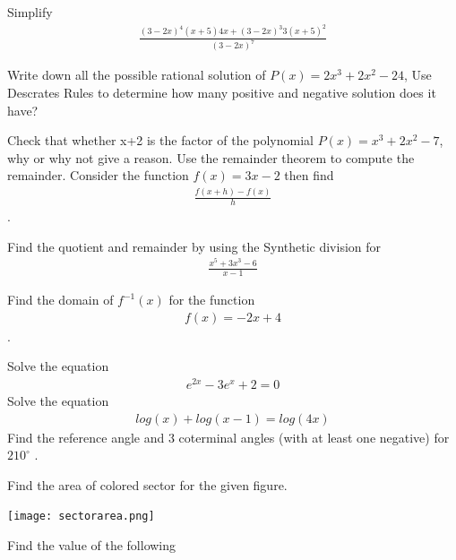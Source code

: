 \documentclass[11pt]{exam}
\begin{document}
\begin{questions}
\addpoints
\question[4] Simplify 
		\begin{align*}
		\frac{(3-2x)^4 (x+5)4x+(3-2x)^3 3(x+5)^2}{(3-2x)^7}
		\end{align*}

\vspace{7cm}
\question[4] Write down all the possible rational solution of $P(x)=2x^3+2x^2-24$, Use Descrates Rules to determine how many positive and negative solution does it have?

\vspace{8cm}
\question[3] Check that whether x+2 is the factor of the polynomial $P(x)=x^3+2x^2-7$, why or why not give a reason. Use the remainder theorem to compute the remainder. 
\vspace{6cm}		
\addpoints
\question[4] Consider the function $f(x)=3x-2$ then find
	\begin{align*}
	\frac{f(x+h)-f(x)}{h}
	\end{align*}.
	

\vspace{8cm}
\addpoints
\question[3] Find the quotient and remainder by using the Synthetic division for 
	\begin{align*}
	\frac{x^5+3x^3-6}{x-1}
	\end{align*}

\vspace{5cm}
\question[4] Find the domain of  $f^{-1}(x)$ for the function
\begin{align*}
f(x)=-2x+4
\end{align*}.
\vspace{8cm}


\addpoints
\question[3] Solve the equation
\begin{align*}
e^{2x}-3e^x+2=0
\end{align*}
\vspace{7cm}
\question[3] Solve the equation
\begin{align*}
log(x) + log(x-1)=log(4x)
\end{align*}
\vspace{7cm}
\question [4] Find the reference angle and 3 coterminal angles (with at least one negative) for $210^\circ$ .

\vspace{8cm}
\addpoints
\question[3]Find the area of colored sector for the given figure. 
\begin{center}
	\texttt{[image: sectorarea.png]}
\end{center}
\addpoints
\question[5] Find the value of the following
\begin{parts}

\end{parts}
\end{questions}
\end{document}
